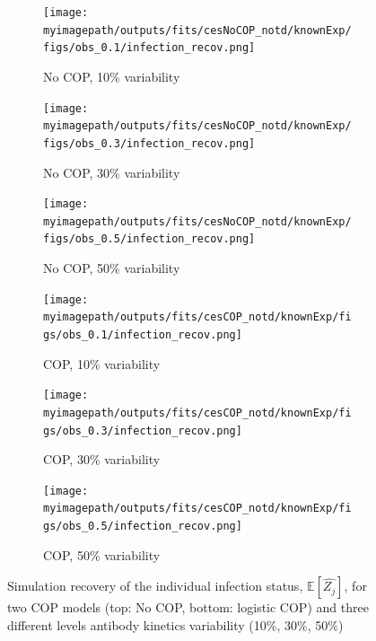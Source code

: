 \begin{figure}[H]
    \centering
    \begin{subfigure}{0.31\textwidth}
        \centering
        \texttt{[image: \\myimagepath/outputs/fits/cesNoCOP\_notd/knownExp/figs/obs\_0.1/infection\_recov.png]}
        \caption{No COP, 10\% variability \label{fit1:infA}}
    \end{subfigure}
    \begin{subfigure}{0.31\textwidth}
        \centering
        \texttt{[image: \\myimagepath/outputs/fits/cesNoCOP\_notd/knownExp/figs/obs\_0.3/infection\_recov.png]}
        \caption{No COP, 30\% variability \label{fit1:infB}}
    \end{subfigure}
    \begin{subfigure}{0.31\textwidth}
        \centering
        \texttt{[image: \\myimagepath/outputs/fits/cesNoCOP\_notd/knownExp/figs/obs\_0.5/infection\_recov.png]}
        \caption{No COP, 50\% variability \label{fit1:infC}}
    \end{subfigure}
    
  \begin{subfigure}{0.31\textwidth}
        \centering
        \texttt{[image: \\myimagepath/outputs/fits/cesCOP\_notd/knownExp/figs/obs\_0.1/infection\_recov.png]}
        \caption{ COP, 10\% variability \label{fit1:infD}}
    \end{subfigure}
    \begin{subfigure}{0.31\textwidth}
        \centering
        \texttt{[image: \\myimagepath/outputs/fits/cesCOP\_notd/knownExp/figs/obs\_0.3/infection\_recov.png]}
        \caption{ COP, 30\% variability \label{fit1:infE}}
    \end{subfigure}
    \begin{subfigure}{0.31\textwidth}
        \centering
        \texttt{[image: \\myimagepath/outputs/fits/cesCOP\_notd/knownExp/figs/obs\_0.5/infection\_recov.png]}
        \caption{ COP, 50\% variability \label{fit1:infF}}
    \end{subfigure}
    
    \caption{Simulation recovery of the individual infection status, $\mathbb{E}[\hat{Z_j}]$, for two COP models (top: No COP, bottom: logistic COP) and three different levels antibody kinetics variability (10\%, 30\%, 50\%) \label{fit1:inf}}
\end{figure}


